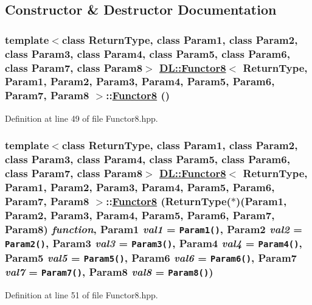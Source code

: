 \subsection{Constructor \& Destructor Documentation}
\hypertarget{classDL_1_1Functor8_d0}{
\subsubsection[Functor8]{\setlength{\rightskip}{0pt plus 5cm}template$<$class Return\-Type, class Param1, class Param2, class Param3, class Param4, class Param5, class Param6, class Param7, class Param8$>$ \hyperlink{classDL_1_1Functor8}{DL::Functor8}$<$ Return\-Type, Param1, Param2, Param3, Param4, Param5, Param6, Param7, Param8 $>$::\hyperlink{classDL_1_1Functor8}{Functor8} ()}}
\label{classDL_1_1Functor8_d0}




Definition at line 49 of file Functor8.hpp.\hypertarget{classDL_1_1Functor8_a0}{
\subsubsection[Functor8]{\setlength{\rightskip}{0pt plus 5cm}template$<$class Return\-Type, class Param1, class Param2, class Param3, class Param4, class Param5, class Param6, class Param7, class Param8$>$ \hyperlink{classDL_1_1Functor8}{DL::Functor8}$<$ Return\-Type, Param1, Param2, Param3, Param4, Param5, Param6, Param7, Param8 $>$::\hyperlink{classDL_1_1Functor8}{Functor8} (Return\-Type($\ast$)(Param1, Param2, Param3, Param4, Param5, Param6, Param7, Param8) {\em function}, Param1 {\em val1} = {\tt Param1()}, Param2 {\em val2} = {\tt Param2()}, Param3 {\em val3} = {\tt Param3()}, Param4 {\em val4} = {\tt Param4()}, Param5 {\em val5} = {\tt Param5()}, Param6 {\em val6} = {\tt Param6()}, Param7 {\em val7} = {\tt Param7()}, Param8 {\em val8} = {\tt Param8()})}}
\label{classDL_1_1Functor8_a0}




Definition at line 51 of file Functor8.hpp.


